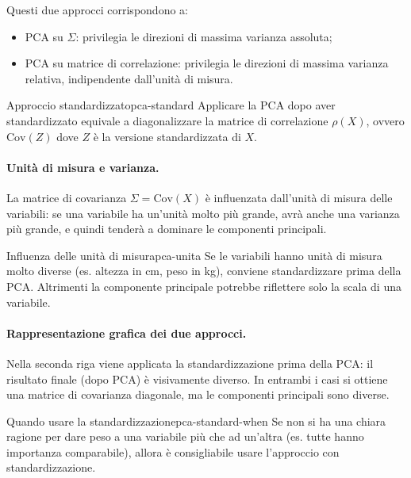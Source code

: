 Questi due approcci corrispondono a:

\begin{itemize}
  \item PCA su \( \Sigma \): privilegia le direzioni di massima varianza
  assoluta;
  \item PCA su matrice di correlazione: privilegia le direzioni di massima
  varianza relativa, indipendente dall'unità di misura.
\end{itemize}

\begin{nota}{Approccio standardizzato}{pca-standard}
Applicare la PCA dopo aver standardizzato equivale a diagonalizzare la matrice
di correlazione \( \rho(X) \), ovvero \( \mathrm{Cov}(Z) \) dove \( Z \) è la
versione standardizzata di \( X \).
\end{nota}

\paragraph{Unità di misura e varianza.}
La matrice di covarianza \( \Sigma = \mathrm{Cov}(X) \) è influenzata
dall’unità di misura delle variabili: se una variabile ha un’unità molto
più grande, avrà anche una varianza più grande, e quindi tenderà a dominare
le componenti principali.

\begin{nota}{Influenza delle unità di misura}{pca-unita}
Se le variabili hanno unità di misura molto diverse (es. altezza in cm, peso in
kg), conviene standardizzare prima della PCA. Altrimenti la componente
principale potrebbe riflettere solo la scala di una variabile.
\end{nota}

\paragraph{Rappresentazione grafica dei due approcci.}

Nella seconda riga viene applicata la standardizzazione prima della PCA: il
risultato finale (dopo PCA) è visivamente diverso. In entrambi i casi si
ottiene una matrice di covarianza diagonale, ma le componenti principali sono
diverse.

\begin{nota}{Quando usare la standardizzazione}{pca-standard-when}
Se non si ha una chiara ragione per dare peso a una variabile più che ad
un'altra (es. tutte hanno importanza comparabile), allora è consigliabile usare
l'approccio con standardizzazione.
\end{nota}



